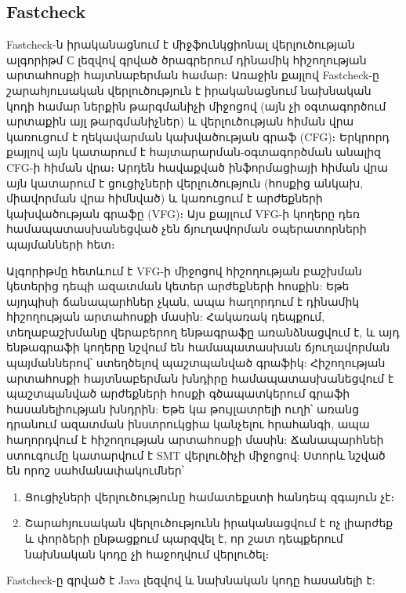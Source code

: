 \subsection{Fastcheck}
Fastcheck\cite{Cherem2007}-ն իրականացնում է միջֆունկցիոնալ վերլուծության ալգորիթմ С լեզվով գրված ծրագրերում դինամիկ
հիշողության արտահոսքի հայտնաբերման համար։ Առաջին քայլով Fastcheck-ը շարահյուսական վերլուծություն է իրականացնում նախնական
կոդի համար ներքին թարգմանիչի միջոցով (այն չի օգտագործում արտաքին այլ թարգմանիչներ) և վերլուծության հիման վրա կառուցում է
ղեկավարման կախվածության գրաֆ (CFG)։ Երկրորդ քայլով այն կատարում է հայտարարման-օգտագործման անալիզ CFG-ի հիման վրա։ Արդեն
հավաքված ինֆորմացիայի հիման վրա այն կատարում է ցուցիչների վերլուծություն (հոսքից անկախ, միավորման վրա հիմնված) և
կառուցում է արժեքների կախվածության գրաֆը (VFG)։ Այս քայլում VFG-ի կողերը դեռ համապատասխանեցված չեն ճյուղավորման
օպերատորների պայմանների հետ։

Ալգորիթմը հետևում է VFG-ի միջոցով հիշողության բաշխման կետերից դեպի ազատման կետեր արժեքների հոսքին: Եթե այդպիսի
ճանապարհներ չկան, ապա հաղորդում է դինամիկ հիշողության արտահոսքի մասին: Հակառակ դեպքում, տեղաբաշխմանը վերաբերող ենթագրաֆը
առանձնացվում է, և այդ ենթագրաֆի կողերը նշվում են համապատասխան ճյուղավորման պայմաններով՝ ստեղծելով պաշտպանված գրաֆիկ:
Հիշողության արտահոսքի հայտնաբերման խնդիրը համապատասխանեցվում է պաշտպանված արժեքների հոսքի գծապատկերում գրաֆի
հասանելիության խնդրին: Եթե կա թույլատրելի ուղի՝ առանց դրանում ազատման ինստրուկցիա կանչելու հրահանգի, ապա հաղորդվում է
հիշողության արտահոսքի մասին: Ճանապարհնեի ստուգումը կատարվում է SMT վերլուծիչի միջոցով: Ստորև նշված են որոշ
սահմանափակումներ՝
\begin{enumerate}
\item Ցուցիչների վերլուծությունը համատեքստի հանդեպ զգայուն չէ։
\item Շարահյուսական վերլուծությունն իրականացվում է ոչ լիարժեք և փորձերի ընթացքում պարզվել է, որ շատ դեպքերում նախնական
կոդը չի հաջողվում վերլուծել։
\end{enumerate}

Fastcheck-ը գրված է Java լեզվով և նախնական կոդը հասանելի է\cite{Fastcheck}:
